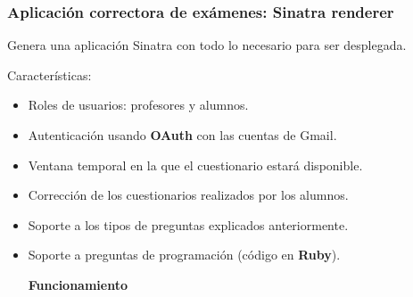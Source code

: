 \documentclass{beamer}
\begin{document}
\begin{frame}[allowframebreaks]
\frametitle{Aplicación correctora de exámenes: Sinatra renderer}
  Genera una aplicación Sinatra con todo lo necesario para ser desplegada.
  \bigskip
  
  Características:
  \begin{itemize}
    \item Roles de usuarios: profesores y alumnos.
    \item Autenticación usando {\bfseries OAuth} con las cuentas de Gmail.
    \item Ventana temporal en la que el cuestionario estará disponible.
    \item Corrección de los cuestionarios realizados por los alumnos.
    \item Soporte a los tipos de preguntas explicados anteriormente.
    \item Soporte a preguntas de programación (código en {\bfseries Ruby}).
    \framebreak
    
    \begin{center}
      {\bfseries {\Large Funcionamiento}}
    \end{center}
    

\end{itemize}
\end{frame}
\end{document}
